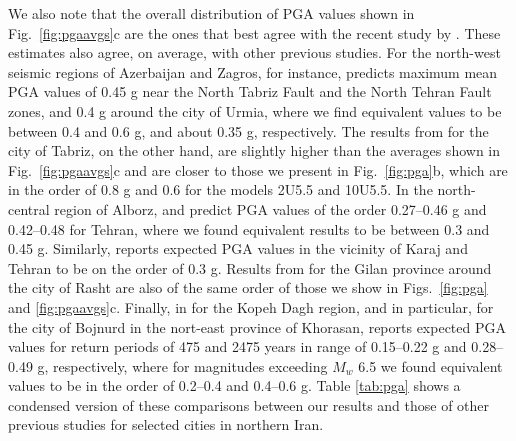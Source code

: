 

We also note that the overall distribution of PGA values shown in Fig.~\ref{fig:pgaavgs}c are the ones that best agree with the recent study by \citet{Khodaverdian_2016_BSSA}. These estimates also agree, on average, with other previous studies. For the north-west seismic regions of Azerbaijan and Zagros, for instance, \citet{Tavakoli1999} predicts maximum mean PGA values of 0.45 g near the North Tabriz Fault and the North Tehran Fault zones, and 0.4 g around the city of Urmia, where we find equivalent values to be between 0.4 and 0.6 g, and about 0.35 g, respectively. The results from \citet{Vafaie2011} for the city of Tabriz, on the other hand, are slightly higher than the averages shown in Fig.~\ref{fig:pgaavgs}c and are closer to those we present in Fig.~\ref{fig:pga}b, which are in the order of 0.8 g and 0.6 for the models 2U5.5 and 10U5.5. In the north-central region of Alborz, \citet{Ghodrati2003} and \citet{Boostan2015} predict PGA values of the order 0.27--0.46 g and 0.42--0.48 for Tehran, where we found equivalent results to be between 0.3 and 0.45 g. Similarly, \citet{Abdi2013} reports expected PGA values in the vicinity of Karaj and Tehran to be on the order of 0.3 g. Results from \citet{Ghodrati2008} for the Gilan province around the city of Rasht are also of the same order of those we show in Figs.~\ref{fig:pga} and \ref{fig:pgaavgs}c. Finally, in for the Kopeh Dagh region, and in particular, for the city of Bojnurd in the nort-east province of Khorasan, \citet{Rahgozar2012} reports expected PGA values for return periods of 475 and 2475 years in range of 0.15--0.22 g and 0.28--0.49 g, respectively, where for magnitudes exceeding $M_w$ 6.5 we found equivalent values to be in the order of 0.2--0.4 and 0.4--0.6 g. Table \ref{tab:pga} shows a condensed version of these comparisons between our results and those of other previous studies for selected cities in northern Iran.

